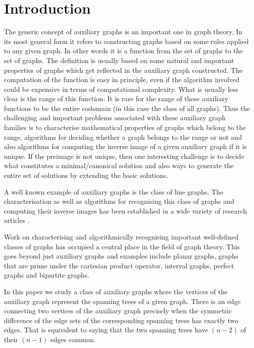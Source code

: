 \documentclass{llncs}
\begin{document}
\section{Introduction}
The generic concept of auxiliary graphs is an important one in graph theory. In its most general form it refers to constructing graphs based on some rules applied to any given graph. In other words it is a function from the set of graphs to the set of graphs. The definition is usually based on some natural and important properties of graphs which get reflected in the auxiliary graph constructed. The computation of the function is easy in principle, even if the algorithm involved could be expensive in terms of computational complexity. What is usually less clear is the range of this function. It is rare for the range of these auxiliary functions to be the entire codomain (in this case the class of all graphs). Thus the challenging and important problems associated with these auxiliary graph families is to characterise mathematical properties of graphs which belong to the range, algorithms for deciding whether a graph belongs to the range or not and also algorithms for computing the inverse image of a given auxiliary graph if it is unique. If the preimage is not unique, then one interesting challenge is to decide what constitutes a minimal/canonical solution and also ways to generate the entire set of solutions by extending the basic solutions.


A well known example of auxiliary graphs is the class of line graphs. The characterisation as well as algorithms for recognising this class of graphs and computing their inverse images has been established in a wide variety of research articles \cite{behzad1970characterization} \cite{lehot1974optimal} \cite{roussopoulos1973max}.

Work on characterising and algorithmically recognising important well-defined classes of graphs has occupied a central place in the field of graph theory. This goes beyond just auxiliary graphs and examples include planar graphs, graphs that are prime under the cartesian product operator, interval graphs, perfect graphs and bipartite graphs. 

In this paper we study a class of auxiliary graphs where the vertices of the auxiliary graph represent the spanning trees of a given graph. There is an edge connecting two vertices of the auxiliary graph precisely when  the symmetric difference of the edge sets of the corresponding spanning trees has exactly two edges. That is equivalent to saying that the two spanning trees have $(n-2)$ of their $(n-1)$ edges common. 
\end{document}
